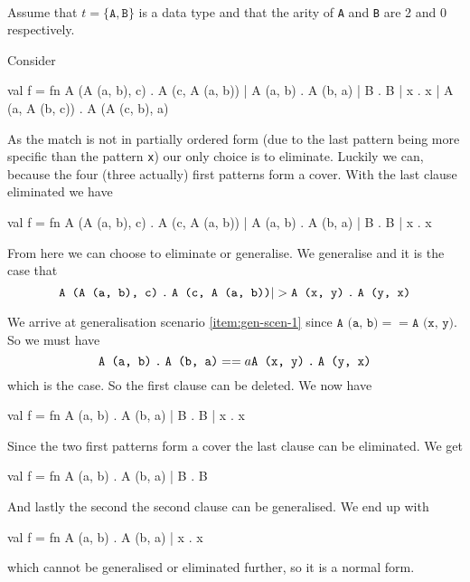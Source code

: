 \begin{example}\ \\
Assume that $t = \{\texttt{A}, \texttt{B}\}$ is a data type and that the arity
of \texttt{A} and \texttt{B} are 2 and 0 respectively.

Consider
\begin{sml}
val f =
fn A (A (a, b), c) . A (c, A (a, b))
 | A (a, b)        . A (b, a)
 | B               . B
 | x               . x
 | A (a, A (b, c)) . A (A (c, b), a)
\end{sml}
As the match is not in partially ordered form (due to the last pattern being
more specific than the pattern \texttt{x}) our only choice is to
eliminate. Luckily we can, because the four (three actually) first patterns
form a cover. With the last clause eliminated we have

\begin{sml}
val f =
fn A (A (a, b), c) . A (c, A (a, b))
 | A (a, b)        . A (b, a)
 | B               . B
 | x               . x
\end{sml}

From here we can choose to eliminate or generalise. We generalise and it is the
case that
\[
\clause{\texttt{A (A (a, b), c)}}{\texttt{A (c, A (a, b))}}
|>
\clause{\texttt{A (x, y)}}{\texttt{A (y, x)}}
\]

We arrive at generalisation scenario \ref{item:gen-scen-1} since $\texttt{A (a, b)} ==
\texttt{A (x, y)}$. So we must have
\[
\texttt{A (a, b)}\mathrel{\texttt{.}}\texttt{A (b, a)}
==a
\texttt{A (x, y)}\mathrel{\texttt{.}}\texttt{A (y, x)}
\]
which is the case. So the first clause can be deleted. We now have

\begin{sml}
val f =
fn A (a, b) . A (b, a)
 | B        . B
 | x        . x
\end{sml}

Since the two first patterns form a cover the last clause can be eliminated. We
get

\begin{sml}
val f =
fn A (a, b) . A (b, a)
 | B        . B
\end{sml}

And lastly the second the second clause can be generalised. We end up with

\begin{sml}
val f =
fn A (a, b) . A (b, a)
 | x        . x
\end{sml}

which cannot be generalised or eliminated further, so it is a normal form.
\end{example}


